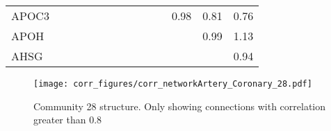 \begin{longtable}{lrrrrrrrrrrrrr}
APOC3 &             &            &           &           &           &           &            &            &            &             &       0.98 &       0.81 &     0.76 \\
APOH  &             &            &           &           &           &           &            &            &            &             &            &       0.99 &     1.13 \\
AHSG  &             &            &           &           &           &           &            &            &            &             &            &            &     0.94 \\
\end{longtable}


\begin{figure}[h!]
\centering
\texttt{[image: corr\_figures/corr\_networkArtery\_Coronary\_28.pdf]}
\caption{Community 28 structure. Only showing connections with correlation greater than 0.8}
\end{figure}





